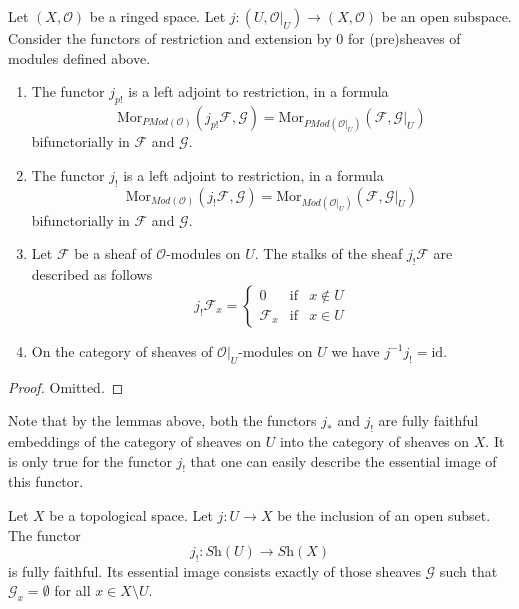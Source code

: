 \begin{lemma}
\label{lemma-j-shriek-modules}
Let $(X, \mathcal{O})$ be a ringed space.
Let $j : (U, \mathcal{O}|_U) \to (X, \mathcal{O})$
be an open subspace.
Consider the functors of restriction and extension
by $0$ for (pre)sheaves of modules defined above.
\begin{enumerate}
\item The functor $j_{p!}$ is a left adjoint to restriction,
in a formula
$$
\text{Mor}_{\textit{PMod}(\mathcal{O})}(j_{p!}\mathcal{F}, \mathcal{G})
=
\text{Mor}_{\textit{PMod}(\mathcal{O}|_U)}(\mathcal{F}, \mathcal{G}|_U)
$$
bifunctorially in $\mathcal{F}$ and $\mathcal{G}$.
\item The functor $j_!$ is a left adjoint to restriction,
in a formula
$$
\text{Mor}_{\textit{Mod}(\mathcal{O})}(j_!\mathcal{F}, \mathcal{G})
=
\text{Mor}_{\textit{Mod}(\mathcal{O}|_U)}(\mathcal{F}, \mathcal{G}|_U)
$$
bifunctorially in $\mathcal{F}$ and $\mathcal{G}$.
\item Let $\mathcal{F}$ be a sheaf of $\mathcal{O}$-modules on $U$.
The stalks of the sheaf $j_!\mathcal{F}$ are described
as follows
$$
j_{!}\mathcal{F}_x =
\left\{
\begin{matrix}
0 & \text{if} & x \not \in U \\
\mathcal{F}_x & \text{if} & x \in U
\end{matrix}
\right.
$$
\item On the category of sheaves of $\mathcal{O}|_U$-modules on $U$
we have $j^{-1}j_! = \text{id}$.
\end{enumerate}
\end{lemma}

\begin{proof}
Omitted.
\end{proof}

\noindent
Note that by the lemmas above, both the functors
$j_*$ and $j_!$ are fully faithful embeddings of
the category of sheaves on $U$ into the category
of sheaves on $X$. It is only true for the functor
$j_!$ that one can easily describe the essential
image of this functor.

\begin{lemma}
\label{lemma-equivalence-categories-open}
Let $X$ be a topological space.
Let $j : U \to X$ be the inclusion of an open subset.
The functor
$$
j_! : \textit{Sh}(U) \longrightarrow \textit{Sh}(X)
$$
is fully faithful. Its essential image consists exactly
of those sheaves $\mathcal{G}$ such that
$\mathcal{G}_x = \emptyset$ for all $x \in X \setminus U$.
\end{lemma}

